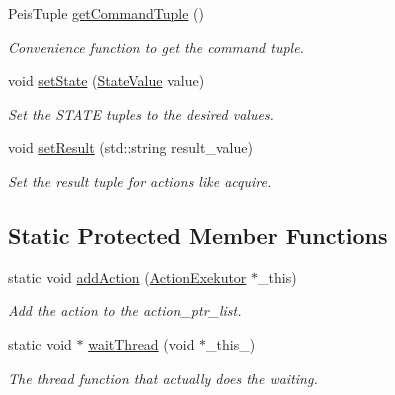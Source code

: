 \begin{DoxyCompactItemize}
\-Peis\-Tuple \hyperlink{classexekutor_1_1ActionExekutor_a1c1f3fdb9bd439a014fa3af470eb250a}{get\-Command\-Tuple} ()
\begin{DoxyCompactList}\small\item\em \-Convenience function to get the command tuple. \end{DoxyCompactList}\item 
void \hyperlink{classexekutor_1_1ActionExekutor_a47056dd4cb829acdbfd6a43378d3f332}{set\-State} (\hyperlink{namespaceexekutor_a82e43e24945d434a81cc5d50282a0e6d}{\-State\-Value} value)
\begin{DoxyCompactList}\small\item\em \-Set the \-S\-T\-A\-T\-E tuples to the desired values. \end{DoxyCompactList}\item 
void \hyperlink{classexekutor_1_1ActionExekutor_a3ae8766878e990bca14bf45761a46bf2}{set\-Result} (std\-::string result\-\_\-value)
\begin{DoxyCompactList}\small\item\em \-Set the result tuple for actions like acquire. \end{DoxyCompactList}\end{DoxyCompactItemize}
\subsection*{\-Static \-Protected \-Member \-Functions}
\begin{DoxyCompactItemize}
\item 
static void \hyperlink{classexekutor_1_1ActionExekutor_ad2beec0ac18fbdaccf66fea31dbc9f69}{add\-Action} (\hyperlink{classexekutor_1_1ActionExekutor}{\-Action\-Exekutor} $\ast$\-\_\-this)
\begin{DoxyCompactList}\small\item\em \-Add the action to the action\-\_\-ptr\-\_\-list. \end{DoxyCompactList}\item 
static void $\ast$ \hyperlink{classexekutor_1_1ActionExekutor_a09a4d87243b3e4c36daf1ea43ee67196}{wait\-Thread} (void $\ast$\-\_\-this\-\_\-)
\begin{DoxyCompactList}\small\item\em \-The thread function that actually does the waiting. \end{DoxyCompactList}\end{DoxyCompactItemize}
